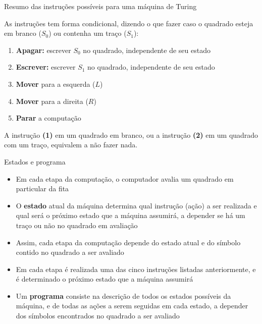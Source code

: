 \begin{frame}[fragile]{Resumo das instruções possíveis para uma máquina de Turing}

    As instruções tem forma condicional, dizendo o que fazer caso o quadrado esteja em branco
    ($S_0$) ou contenha um traço ($S_1$):

    \vspace{0.1in}

    \begin{enumerate}[(1)]
        \item \textbf{Apagar:} escrever $S_0$ no quadrado, independente de seu estado
        \item \textbf{Escrever:} escrever $S_1$ no quadrado, independente de seu estado
        \item \textbf{Mover} para a esquerda ($L$)
        \item \textbf{Mover} para a direita ($R$)
        \item \textbf{Parar} a computação
    \end{enumerate}

    \vspace{0.1in}
    A instrução \textbf{(1)} em um quadrado em branco, ou a instrução \textbf{(2)} em um quadrado
    com um traço, equivalem a não fazer nada.
\end{frame}

\begin{frame}[fragile]{Estados e programa}

    \begin{itemize}
        \item Em cada etapa da computação, o computador avalia um quadrado em particular da fita

        \item O \textbf{estado} atual da máquina determina qual instrução (ação) a ser realizada
            e qual será o próximo estado que a 
            máquina assumirá, a depender se há um traço ou não no quadrado em avaliação

        \item Assim, cada etapa da computação depende do estado atual e do símbolo contido no 
            quadrado a ser avaliado

        \item Em cada etapa é realizada uma das cinco instruções listadas anteriormente, e é 
            determinado o próximo estado que a máquina assumirá

        \item Um \textbf{programa} consiste na descrição de todos os estados possíveis da máquina,
            e de todas as ações a serem seguidas em cada estado, a depender dos símbolos 
            encontrados no quadrado a ser avaliado
    \end{itemize}

\end{frame}

